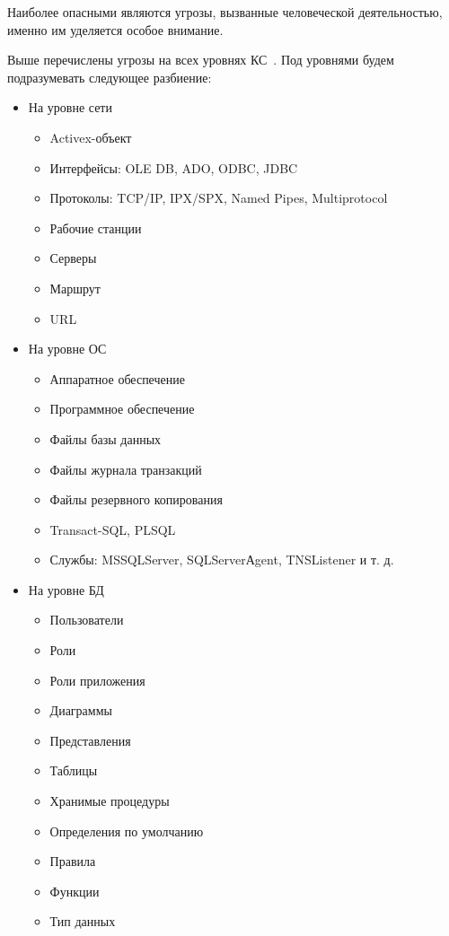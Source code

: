 Наиболее опасными являются угрозы, вызванные человеческой деятельностью, именно им уделяется особое внимание.

Выше перечислены угрозы на всех уровнях КС~\label{pon:urovs}. Под уровнями будем подразумевать следующее разбиение:
\begin{itemize}
	\item На уровне сети
	\begin{itemize}
		\item Activex-объект
		\item Интерфейсы: OLE DB, ADO, ODBC, JDBC
		\item Протоколы: TCP/IP, IPX/SPX, Named Pipes, Multiprotocol
		\item Рабочие станции
		\item Серверы
		\item Маршрут
		\item URL
	\end{itemize}
	\item На уровне ОС
	\begin{itemize}
		\item Аппаратное обеспечение
		\item Программное обеспечение
		\item Файлы базы данных
		\item Файлы журнала транзакций
		\item Файлы резервного копирования
		\item Transact-SQL, PLSQL
		\item Службы: MSSQLServer, SQLServerАgent, TNSListener и т. д.
	\end{itemize}
	\item На уровне БД
	\begin{itemize}
		\item Пользователи
		\item Роли
		\item Роли приложения
		\item Диаграммы
		\item Представления
		\item Таблицы
		\item Хранимые процедуры
		\item Определения по умолчанию
		\item Правила
		\item Функции
		\item Тип данных
	\end{itemize}
\end{itemize}

